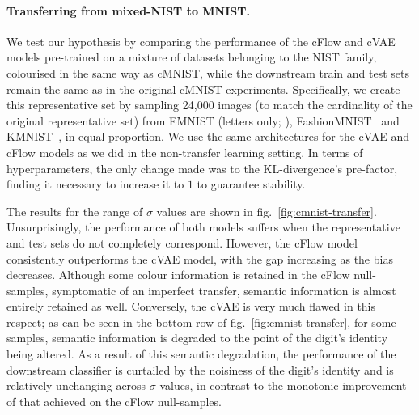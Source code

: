 \paragraph{Transferring from mixed-NIST to MNIST.}
%
We test our hypothesis by comparing the performance of the \ac{cFlow} and \ac{cVAE} models pre-trained on a
mixture of datasets belonging to the NIST family, colourised in the same way as cMNIST, while the
downstream train and test sets remain the same as in the original cMNIST experiments. 
%
Specifically, we create this representative set by sampling 24,000 images (to match the cardinality
of the original representative set) from EMNIST (letters only; \citealp{cohen2017emnist}),
Fashion\-MNIST~\citep{xiao2017fashion} and KMNIST~\citep{clanuwat2018deep}, in equal proportion. 
%
We use the same architectures for the \ac{cVAE} and \ac{cFlow} models as we did in the non-transfer learning
setting. 
%
In terms of hyperparameters, the only change made was to the KL-divergence's pre-factor, finding it
necessary to increase it to $1$ to guarantee stability.

The results for the range of $\sigma$ values are shown in fig.~\ref{fig:cmnist-transfer}.
%
Unsurprisingly, the performance of both models suffers when the representative and test sets do not
completely correspond. 
%
However, the \ac{cFlow} model consistently outperforms the \ac{cVAE} model, with the gap increasing as the
bias decreases. 
%
Although some colour information is retained in the \ac{cFlow} null-samples, symptomatic of an imperfect
transfer, semantic information is almost entirely retained as well. 
%
Conversely, the \ac{cVAE} is very much flawed in this respect; as can be seen in the bottom row of
fig.~\ref{fig:cmnist-transfer}, for some samples, semantic information is degraded to the point of
the digit's identity being altered. 
%
As a result of this semantic degradation, the performance of the downstream classifier is curtailed
by the noisiness of the digit's identity and is relatively unchanging across $\sigma$-values, in
contrast to the monotonic improvement of that achieved on the \ac{cFlow} null-samples.



% 
% 


% 
